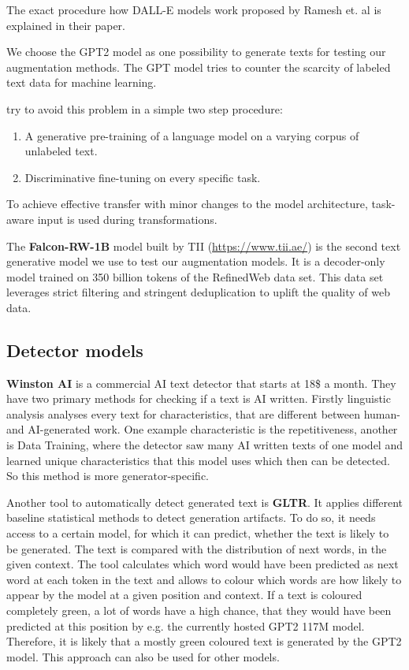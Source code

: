 \documentclass{article} %
\begin{document}
The exact procedure how DALL-E models work proposed by Ramesh et. al is explained in their paper. \cite{ramesh2021zeroshot}

We choose the GPT2 model as one possibility to generate texts for testing our augmentation methods. The GPT model tries to counter the scarcity of labeled text data for machine learning. 

\cite{radford2018improving} try to avoid this problem in a simple two step procedure:
\begin{enumerate}
	\item A generative pre-training of a language model on a varying corpus of unlabeled text.
	\item Discriminative fine-tuning on every specific task.
\end{enumerate}

To achieve effective transfer with minor changes to the model architecture, task-aware input is used during transformations. \cite{radford2018improving}

The \textbf{Falcon-RW-1B} model built by TII (\url{https://www.tii.ae/}) is the second text generative model we use to test our augmentation models. It is a decoder-only model trained on 350 billion tokens of the RefinedWeb data set. This data set leverages strict filtering and stringent deduplication to uplift the quality of web data. \cite{penedo2023refinedweb}

\subsection{Detector models}

\textbf{Winston AI} is a commercial AI text detector that starts at 18\$ a month. They have two primary methods for checking if a text is AI written. Firstly linguistic analysis analyses every text for characteristics, that are different between human- and AI-generated work. One example characteristic is the repetitiveness, another is Data Training, where the detector saw many AI written texts of one model and learned unique characteristics that this model uses which then can be detected. So this method is more generator-specific. \cite{WinstonAI}

Another tool to automatically detect generated text is \textbf{GLTR}. It applies different baseline statistical methods to detect generation artifacts. To do so, it needs access to a certain model, for which it can predict, whether the text is likely to be generated. The text is compared with the distribution of next words, in the given context. The tool calculates which word would have been predicted as next word at each token in the text and allows to colour which words are how likely to appear by the model at a given position and context. If a text is coloured completely green, a lot of words have a high chance, that they would have been predicted at this position by e.g. the currently hosted GPT2 117M model. Therefore, it is likely that a mostly green coloured text is generated by the GPT2 model. This approach can also be used for other models. \cite{gehrmann2019gltr}
\end{document}
